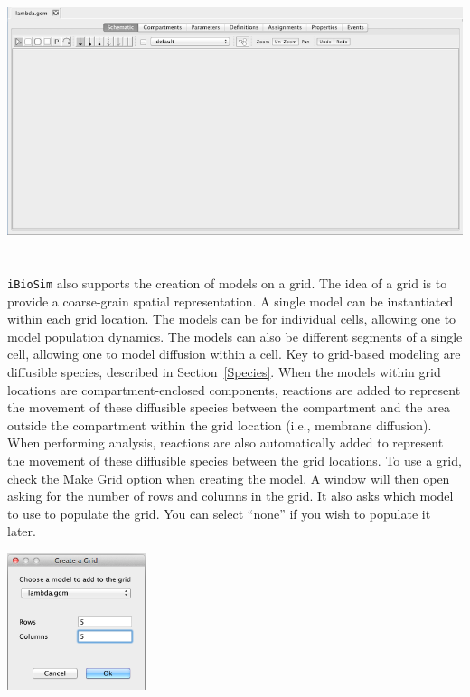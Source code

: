 \documentclass[titlepage,11pt]{article}
\begin{document}
\begin{center}
\includegraphics[height=80mm]{screenshots/ModelEditor}
\end{center}

\noindent
{\tt iBioSim} also supports the creation of models on a grid.  The idea of a grid is to provide a coarse-grain spatial representation.  A single model can be instantiated within each grid location.  The models can be for individual cells, allowing one to model population dynamics.  The models can also be different segments of a single cell, allowing one to model diffusion within a cell.  Key to grid-based modeling are diffusible species, described in Section~\ref{Species}.  When the models within grid locations are compartment-enclosed components, reactions are added to represent the movement of these diffusible species between the compartment and the area outside the compartment within the grid location (i.e., membrane diffusion).  When performing analysis, reactions are also automatically added to represent the movement of these diffusible species between the grid locations.  To use a grid, check the Make Grid option when creating the model.  A window will then open asking for the number of rows and columns in the grid.  It also asks which model to use to populate the grid.  You can select ``none'' if you wish to populate it later.

\begin{center}
\includegraphics[height=40mm]{screenshots/createGrid}
\end{center}
\end{document}
